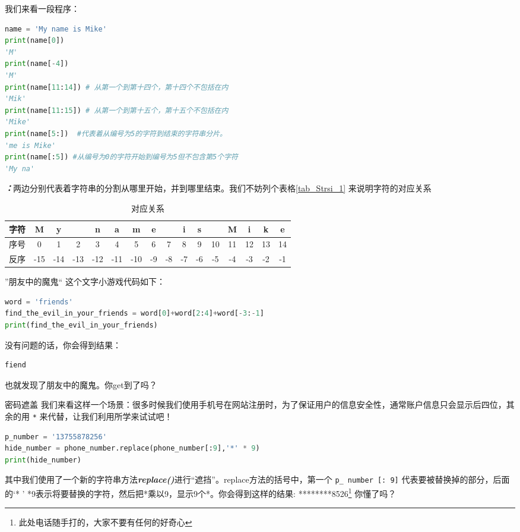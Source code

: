 我们来看一段程序：
\begin{lstlisting}[language=python]
name = 'My name is Mike'
print(name[0])
'M'
print(name[-4])
'M'
print(name[11:14]) # 从第一个到第十四个，第十四个不包括在内
'Mik'
print(name[11:15]) # 从第一个到第十五个，第十五个不包括在内
'Mike'
print(name[5:])  #代表着从编号为5的字符到结束的字符串分片。
'me is Mike'
print(name[:5]) #从编号为0的字符开始到编号为5但不包含第5个字符
'My na'
\end{lstlisting}
\textbf{\textsl{：}}两边分别代表着字符串的分割从哪里开始，并到哪里结束。我们不妨列个表格\autoref{tab_Strsi_1} 来说明字符的对应关系
\begin{table}[ht]
\centering
\caption{对应关系}\label{tab_Strsi_1}
\begin{tabular}{|c|c|c|c|c|c|c|c|c|c|c|c|c|c|c|c|}
\hline
 字符  & M & y &   & n & a & m & e &   & i & s &   & M & i & k &e\\
\hline
 序号  & 0 & 1 & 2 & 3 & 4 & 5 & 6 & 7 & 8 & 9 & 10 & 11 & 12 & 13 & 14\\
\hline
 反序  & -15 & -14 & -13 & -12 & -11 & -10 & -9 & -8 & -7 & -6 & -5 & -4 & -3 & -2 & -1\\
\hline
\end{tabular}
\end{table}
\begin{example}{”朋友中的魔鬼“}
这个文字小游戏代码如下：
\begin{lstlisting}[language=python]
word = 'friends'
find_the_evil_in_your_friends = word[0]+word[2:4]+word[-3:-1] 
print(find_the_evil_in_your_friends)
\end{lstlisting}
没有问题的话，你会得到结果：
\begin{lstlisting}[language=python]
fiend
\end{lstlisting}
也就发现了朋友中的魔鬼。你get到了吗？
\end{example}
\begin{example}{密码遮盖}
我们来看这样一个场景：很多时候我们使用手机号在网站注册时，为了保证用户的信息安全性，通常账户信息只会显示后四位，其余的用 \verb`*` 来代替，让我们利用所学来试试吧！
\begin{lstlisting}[language=python]
p_number = '13755878256'
hide_number = phone_number.replace(phone_number[:9],'*' * 9)
print(hide_number)
\end{lstlisting}
其中我们使用了一个新的字符串方法\textbf{\textsl{replace()}}进行“遮挡”。replace方法的括号中，第一个 \verb`p_ number [: 9]` 代表要被替换掉的部分，后面的‘* ' *9表示将要替换的字符，然后把*乘以9，显示9个*。你会得到这样的结果: ********8526\footnote{此处电话随手打的，大家不要有任何的好奇心}
你懂了吗？
\end{example}

